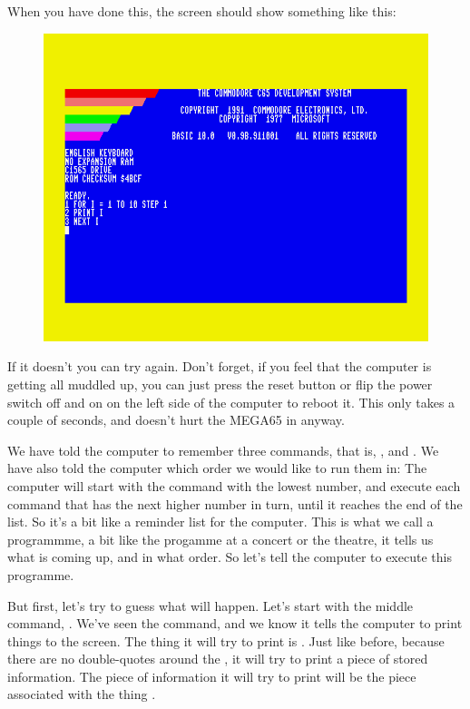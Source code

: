 When you have done this, the screen should show something like this:

\setlength{\intextsep}{0pt}%
  \begin{figure}
    \includegraphics[width=\linewidth]{images/first-steps-for-loop-programme-1.png}
  \end{figure}

If it doesn't you
can try again. Don't forget, if you feel that the computer is getting all muddled up,
you can just press the reset button or flip the power switch off and on on the left side of the
computer to reboot it. This only takes a couple of seconds, and doesn't hurt the MEGA65
in anyway.

We have told the computer to remember three commands, that is, ,
and .  We have also told the computer which order we would like to run them in: The
computer will start with the command with the lowest number, and execute each command that
has the next higher number in turn, until it reaches the end of the list.  So it's a bit like
a reminder list for the computer. This is what we call a programmme, a bit like the progamme at
a concert or the theatre, it tells us what is coming up, and in what order.
So let's tell the computer to execute this programme.

But first, let's try to guess what will happen.  Let's start with the middle command, .
We've seen the  command, and we know it tells the computer to print things to the screen.
The thing it will try to print is .  Just like before, because there are no double-quotes
around the , it will try to print a piece of stored information.  The piece of information
it will try to print will be the piece associated with the thing .

